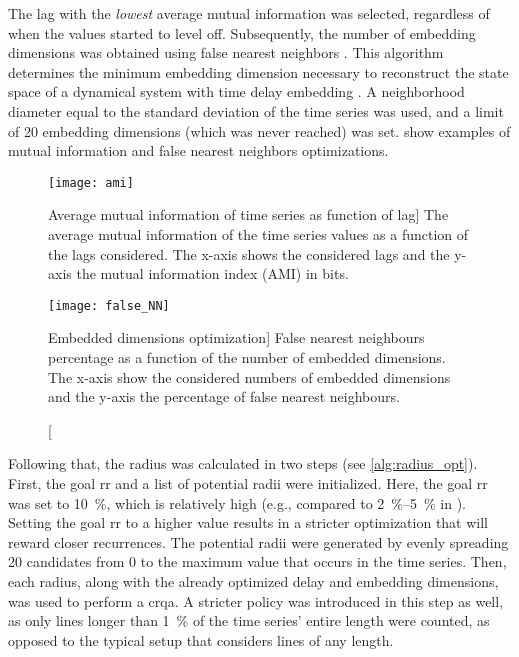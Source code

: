 The lag with the \emph{lowest} average mutual information was selected, regardless of when the values started to level off.
Subsequently, the number of embedding dimensions was obtained using false nearest neighbors \citep{Kennel1992determining}.
This algorithm determines the minimum embedding dimension necessary to reconstruct the state space of a dynamical system with time delay embedding \citep{Abarbanel1993local}.
A neighborhood diameter equal to the standard deviation of the time series was used, and a limit of 20 embedding dimensions (which was never reached) was set.
 show examples of mutual information and false nearest neighbors optimizations.
%
\begin{figure}[H]
	\centering
	\begin{minipage}{.45\linewidth}
		\centering
		\texttt{[image: ami]}
		\caption
		[Average mutual information of time series as function of lag]
		{The average mutual information of the time series values as a function of the lags considered.
			The x-axis shows the considered lags and the y-axis the mutual information index (AMI) in bits.}
		\label{fig:ami}
	\end{minipage}%
	\hfill
	\begin{minipage}{.45\linewidth}
		\centering
		\texttt{[image: false\_NN]}
		\caption
		[Embedded dimensions optimization]
		{False nearest neighbours percentage as a function of the number of embedded dimensions.
			The x-axis show the considered numbers of embedded dimensions and the y-axis the percentage of false nearest neighbours.}
		\label{fig:false_nn}
	\end{minipage}	
\end{figure}
%
Following that, the radius was calculated in two steps (see \cref{alg:radius_opt}).
First, the goal \ac{rr} and a list of potential radii were initialized.
Here, the goal \ac{rr} was set to \SI{10}{\percent}, which is relatively high (e.g., compared to \SIrange{2}{5}{\percent} in \citet{Coco2014crqa-r}).
Setting the goal \ac{rr} to a higher value results in a stricter optimization that will reward closer recurrences.
The potential radii were generated by evenly spreading 20 candidates from 0 to the maximum value that occurs in the time series.
Then, each radius, along with the already optimized delay and embedding dimensions, was used to perform a \ac{crqa}.
A stricter policy was introduced in this step as well, as only lines longer than \SI{1}{\percent} of the time series' entire length were counted, as opposed to the typical setup that considers lines of any length.
